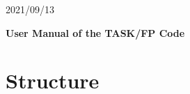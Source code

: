 \documentclass[11pt]{article}
\begin{document}
\begin{flushright}
2021/09/13
\end{flushright}

\begin{center}
\textbf{\Large User Manual of the TASK/FP Code}
\end{center}

\tableofcontents

\section{Structure}

\subsection{}
\end{document}
